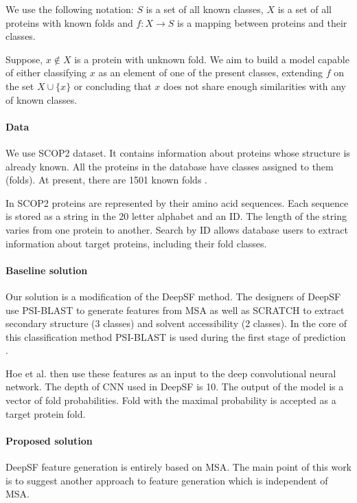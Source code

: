 \documentclass[12pt, twoside]{article}
\begin{document}
We use the following notation: $S$ is a set of all known classes, $X$ is a set of all proteins with known folds and  $f: X \rightarrow S$ is a mapping between proteins and their classes. 

Suppose, $x \not\in X$ is a protein with unknown fold. We aim to build a model capable of either classifying $x$ as an element of one of the present classes, extending $f$ on the set $X \cup \{x\}$ or concluding that $x$ does not share enough similarities with any of known classes. 

\paragraph{Data}
\noindent
We use SCOP2 \cite{SCOP2FST, SCOP2SND} dataset. It contains information about proteins whose structure is already known. All the proteins in the database have classes assigned to them (folds).  At present, there are 1501 known folds \cite{SCOP2SND}. 

In SCOP2 proteins are represented by their amino acid sequences. Each sequence is stored as a string in the 20 letter alphabet and an ID. The length of the string varies from one protein to another. Search by ID allows database users to extract information about target proteins, including their fold classes. 

\paragraph{Baseline solution}
\noindent
Our solution is a modification of the DeepSF \cite{DeepSF} method. The designers of DeepSF use PSI-BLAST\cite{PSIBLAST} to generate features from MSA  as well as SCRATCH \cite{SCRATCH} to extract secondary structure (3 classes) and solvent accessibility (2 classes).  In the core of this classification method PSI-BLAST is used during the first stage of prediction \cite{SCRATCH}. 

Hoe et al. then use these features as an input to the deep convolutional neural network. The depth of CNN used in DeepSF is 10. The output of the model is a vector of fold probabilities. Fold with the maximal probability is accepted as a target protein fold. 

\paragraph{Proposed solution}
\noindent

DeepSF feature generation is entirely based on MSA. The main point of this work is to suggest another approach to feature generation which is independent of MSA. 
\end{document}
